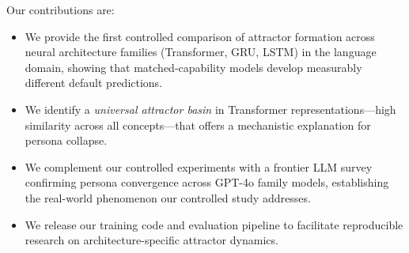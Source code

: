 Our contributions are:
\begin{itemize}[leftmargin=*,itemsep=0pt,topsep=0pt]
    \item We provide the first controlled comparison of attractor formation across neural architecture families (Transformer, GRU, LSTM) in the language domain, showing that matched-capability models develop measurably different default predictions.
    \item We identify a \emph{universal attractor basin} in Transformer representations---high similarity across all concepts---that offers a mechanistic explanation for persona collapse.
    \item We complement our controlled experiments with a frontier LLM survey confirming persona convergence across GPT-4o family models, establishing the real-world phenomenon our controlled study addresses.
    \item We release our training code and evaluation pipeline to facilitate reproducible research on architecture-specific attractor dynamics.
\end{itemize}
